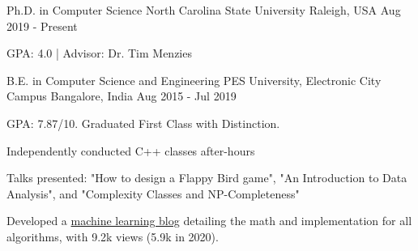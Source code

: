 

\begin{cventries}

  \cventry
    {Ph.D. in Computer Science} %
    {North Carolina State University} %
    {Raleigh, USA} %
    {Aug 2019 - Present} %
    {
    	\begin{cvitems}
    		\item {GPA: 4.0 | Advisor: Dr. Tim Menzies}
    	\end{cvitems}
    }

  \cventry
    {B.E. in Computer Science and Engineering} %
    {PES University, Electronic City Campus} %
    {Bangalore, India} %
    {Aug 2015 - Jul 2019} %
    {
      \begin{cvitems} %
        \item {GPA: 7.87/10. Graduated First Class with Distinction.}
        \item {Independently conducted C++ classes after-hours}
        \item {Talks presented: "How to design a Flappy Bird game", "An Introduction to Data Analysis", and "Complexity Classes and NP-Completeness"}
        \item {Developed a \href{www.beginningwithml.wordpress.com}{machine learning blog} detailing the math and implementation for all algorithms, with 9.2k views (5.9k in 2020).}
      \end{cvitems}
    }

\end{cventries}
